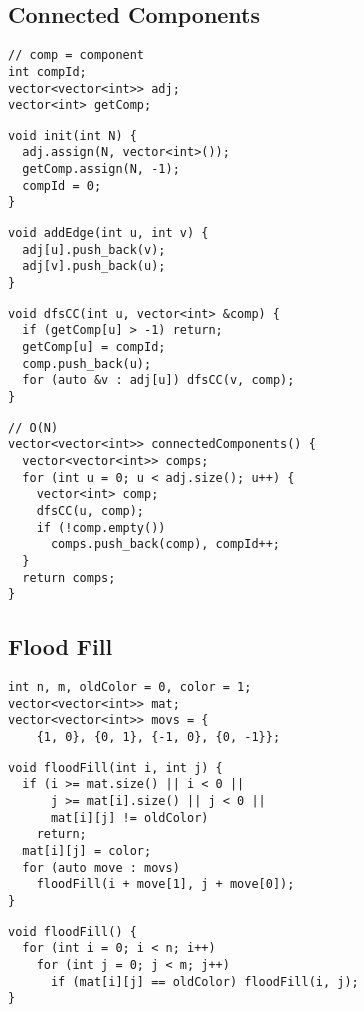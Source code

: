 \documentclass[twoside]{article}
\begin{document}
\begin{multicols*}{2}
\subsection*{Connected Components}
\begin{verbatim}
// comp = component
int compId;
vector<vector<int>> adj;
vector<int> getComp;
\end{verbatim}
\vspace{-12pt}
\begin{verbatim}
void init(int N) {
  adj.assign(N, vector<int>());
  getComp.assign(N, -1);
  compId = 0;
}
\end{verbatim}
\vspace{-12pt}
\begin{verbatim}
void addEdge(int u, int v) {
  adj[u].push_back(v);
  adj[v].push_back(u);
}
\end{verbatim}
\vspace{-12pt}
\begin{verbatim}
void dfsCC(int u, vector<int> &comp) {
  if (getComp[u] > -1) return;
  getComp[u] = compId;
  comp.push_back(u);
  for (auto &v : adj[u]) dfsCC(v, comp);
}
\end{verbatim}
\vspace{-12pt}
\begin{verbatim}
// O(N)
vector<vector<int>> connectedComponents() {
  vector<vector<int>> comps;
  for (int u = 0; u < adj.size(); u++) {
    vector<int> comp;
    dfsCC(u, comp);
    if (!comp.empty())
      comps.push_back(comp), compId++;
  }
  return comps;
}
\end{verbatim}

\subsectionfont{\large\bfseries\sffamily\underline}
\subsection*{Flood Fill}
\begin{verbatim}
int n, m, oldColor = 0, color = 1;
vector<vector<int>> mat;
vector<vector<int>> movs = {
    {1, 0}, {0, 1}, {-1, 0}, {0, -1}};
\end{verbatim}
\vspace{-12pt}
\begin{verbatim}
void floodFill(int i, int j) {
  if (i >= mat.size() || i < 0 ||
      j >= mat[i].size() || j < 0 ||
      mat[i][j] != oldColor)
    return;
  mat[i][j] = color;
  for (auto move : movs)
    floodFill(i + move[1], j + move[0]);
}
\end{verbatim}
\vspace{-12pt}
\begin{verbatim}
void floodFill() {
  for (int i = 0; i < n; i++)
    for (int j = 0; j < m; j++)
      if (mat[i][j] == oldColor) floodFill(i, j);
}
\end{verbatim}


\end{multicols*}
\end{document}
